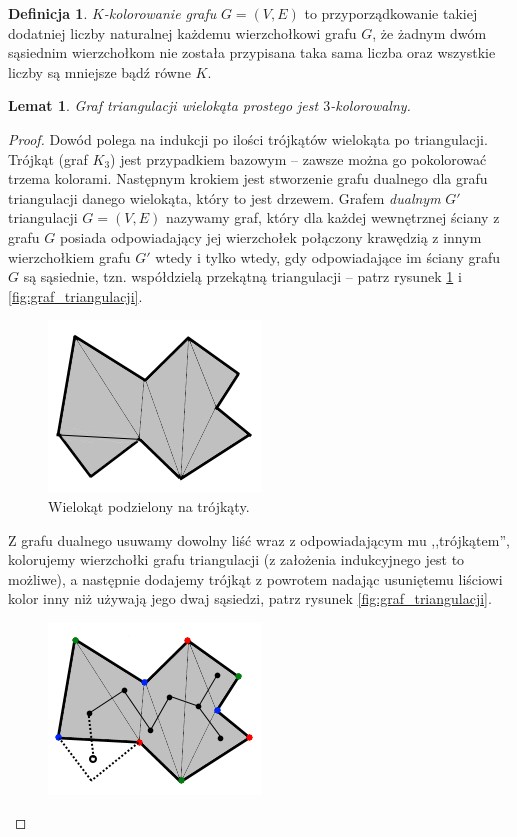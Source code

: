 \documentclass[brudnopis]{xmgr}
\newtheorem{Lemat}{Lemat}
\theoremstyle{definition}
\newtheorem{Definicja}{Definicja}
\begin{document}
\begin{Definicja} 
   \emph{$K$-kolorowanie grafu} $G = (V,E)$ to przyporządkowanie takiej dodatniej liczby naturalnej każdemu wierzchołkowi grafu $G$, że żadnym dwóm sąsiednim wierzchołkom nie została przypisana taka sama liczba oraz wszystkie liczby są mniejsze bądź równe $K$.
\end{Definicja}

\begin{Lemat} \cite{fisk}
Graf triangulacji wielokąta prostego jest $3$-kolorowalny.
\end{Lemat}
\begin{proof}
	Dowód polega na indukcji po ilości trójkątów wielokąta po triangulacji. Trójkąt (graf $K_3$) jest przypadkiem bazowym -- zawsze można go pokolorować trzema kolorami. Następnym krokiem jest stworzenie grafu  dualnego dla grafu triangulacji danego wielokąta, który to jest drzewem. Grafem \emph{dualnym} $G'$ triangulacji $G=(V,E)$ nazywamy graf, który dla każdej wewnętrznej ściany z grafu $G$ posiada odpowiadający jej wierzchołek połączony krawędzią z innym wierzchołkiem grafu $G'$ wtedy i tylko wtedy, gdy odpowiadające im ściany grafu $G$ są sąsiednie, tzn. współdzielą przekątną triangulacji -- patrz rysunek \ref{fig:triangulacja_wielokata} i \ref{fig:graf_triangulacji}.
	\begin{figure}[ht!]
	  \centering
	  \includegraphics{rysunki/dual.png}
	    \caption{Wielokąt podzielony na trójkąty.}
      \label{fig:triangulacja_wielokata}
	\end{figure} 
	Z grafu dualnego usuwamy dowolny liść wraz z odpowiadającym mu ,,trójkątem'', kolorujemy wierzchołki grafu triangulacji (z założenia indukcyjnego jest to możliwe), a następnie dodajemy trójkąt z powrotem nadając usuniętemu liściowi kolor inny niż używają jego dwaj sąsiedzi, patrz rysunek \ref{fig:graf_triangulacji}.
  \begin{figure}[ht!]
    \centering
      \includegraphics{rysunki/dual_kolor.png} 

\end{figure}
\end{proof}
\end{document}
